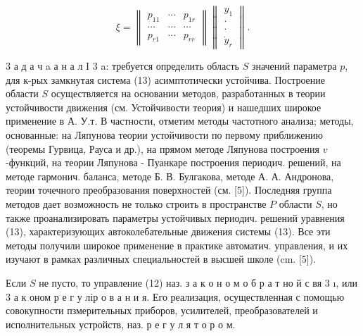 \documentclass[10pt]{article}
\begin{document}
\[

\xi=\left\|\begin{array}{ccc}

p_{11} & \cdots & p_{1 r} \\

\cdots & \cdots & \cdots \\

p_{r 1} & \cdots & p_{r r}

\end{array}\right\|\left\|\begin{array}{l}

y_{1} \\

\cdot \\

\cdot \\

\dot{y}_{r}

\end{array}\right\| .

\]



3 а д а ч a а н а л I 3 a: требуется определить область $S$ значений параметра $p$, для к-рых замкнутая система (13) асимптотически устойчива. Построение области $S$ осуществляется на основании методов, разработанных в теории устойчивости движения (см. Устойчивости теория) и нашедших широкое применение в А. У.т. В частности, отметим методы частотного анализа; методы, основанные: на Ляпунова теории устойчивости по первому приближению (теоремы Гурвица, Рауса и др.), на прямом методе Ляпунова построения $v$-функций, на теории Ляпунова - Пуанкаре построения периодич. решений, на методе гармонич. баланса, методе Б. В. Булгакова, методе А. А. Андронова, теории точечного преобразования поверхностей (см. [5]). Последняя группа методов дает возможность не только строить в пространстве $P$ области $S$, но также проанализировать параметры устойчивых периодич. решений уравнения (13), характеризующих автоколебательные движения системы (13). Все эти методы получили широкое применение в практике автоматич. управления, и их изучают в рамках различных специальностей в высшей школе (cm. [5]).



Если $S$ не пусто, то управление (12) наз. з а к о н о м о б р а т но й с вя 3 ı, или 3 а к оном р е г у лір о в а н и я. Его реализация, осуществленная с помощью совокупности пзмерительных приборов, усилителей, преобразователей и исполнительных устройств, наз. р е г у л я т о р о м.
\end{document}
